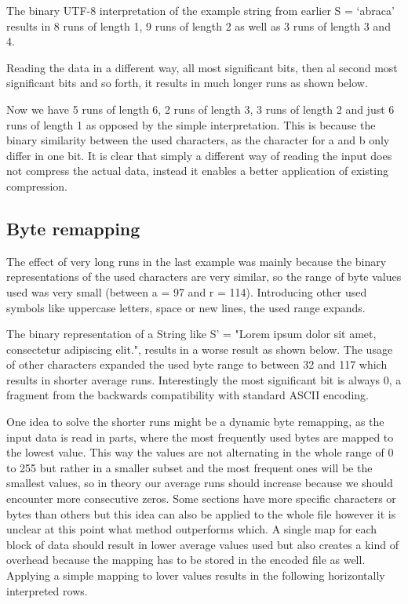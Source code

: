 \par{
The binary UTF-8 interpretation of the example string from earlier S = ‘abraca’ results in 8 runs of length 1, 9 runs of length 2 as well as 3 runs of length 3 and 4.  
\scalardump\dataA

Reading the data in a different way, all most significant bits, then al second most significant bits and so forth, it results in much longer runs as shown below.
\arraydump\dataA

Now we have 5 runs of length 6, 2 runs of length 3, 3 runs of length 2 and just 6 runs of length 1 as opposed by the simple interpretation. This is because the binary similarity between the used characters, as the character for a and b only differ in one bit. It is clear that simply a different way of reading the input does not compress the actual data, instead it enables a better application of existing compression. 
}

\subsection{Byte remapping}
\label{ch:Analysis:sec:Improvements by Preprocessing:subSec:byteRemapping}
\par{
The effect of very long runs in the last example was mainly because the binary representations of the used characters are very similar, so the range of byte values used was very small (between a = 97 and r = 114). Introducing other used symbols like uppercase letters, space or new lines, the used range expands.
}

\par{
The binary representation of a String like S' = "Lorem ipsum dolor sit amet, consectetur adipiscing elit.", results in a worse result as shown below. 
The usage of other characters expanded the used byte range to between 32 and 117 which results in shorter average runs. Interestingly the most significant bit is always 0, a fragment from the backwards compatibility with standard ASCII encoding.

\arraydump\dataB
}

\par{
One idea to solve the shorter runs might be a dynamic byte remapping, as the input data is read in parts, where the most frequently used bytes are mapped to the lowest value. This way the values are not alternating in the whole range of 0 to 255 but rather in a smaller subset and the most frequent ones will be the smallest values, so in theory our average runs should increase because we should encounter more consecutive zeros. Some sections have more specific characters or bytes than others but this idea can also be applied to the whole file however it is unclear at this point what method outperforms which. A single map for each block of data should result in lower average values used but also creates a kind of overhead because the mapping has to be stored in the encoded file as well. Applying a simple mapping to lover values results in the following horizontally interpreted rows.
}

